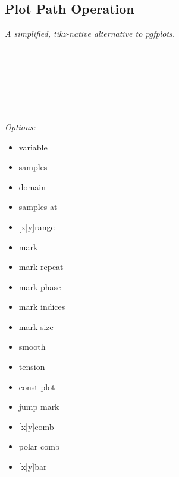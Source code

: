 \subsection*{Plot Path Operation}
\textit{A simplified, tikz-native alternative to pgfplots.}\\
\\
\\
\\
\\
\\
\\
\\[1mm]
\textit{Options:}
{\scriptsize \begin{multicols}{3}\begin{itemize}[leftmargin=1mm,label={}]
    \item variable
    \item samples
    \item domain
    \item samples at
    \item {[x|y]range}
    \item mark
    \item mark repeat
    \item mark phase
    \item mark indices
    \item mark size
    \item smooth
    \item tension
    \item const plot
    \item jump mark
    \item {[x|y]}comb
    \item polar comb
    \item {[x|y]}bar
\end{itemize}\end{multicols}}
